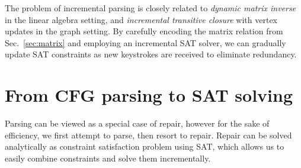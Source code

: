 \documentclass[sigplan,review,anonymous,acmsmall]{acmart}\settopmatter{printfolios=false,printccs=false,printacmref=false}
\begin{document}
The problem of incremental parsing is closely related to \textit{dynamic matrix inverse} in the linear algebra setting, and \textit{incremental transitive closure} with vertex updates in the graph setting. By carefully encoding the matrix relation from Sec.~\ref{sec:matrix} and employing an incremental SAT solver, we can gradually update SAT constraints as new keystrokes are received to eliminate redundancy.

\section{From CFG parsing to SAT solving}\label{sec:sat}

Parsing can be viewed as a special case of repair, however for the sake of efficiency, we first attempt to parse, then resort to repair. Repair can be solved analytically as constraint satisfaction problem using SAT, which allows us to easily combine constraints and solve them incrementally.

\begin{figure}[H]
\end{figure}


\end{document}
